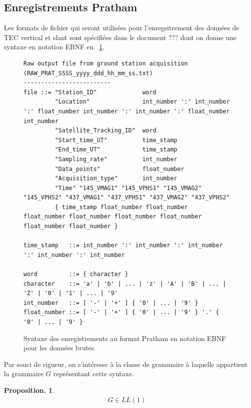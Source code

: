 \documentclass[twocolumn,pre,floats,aps,amsmath,amssymb]{revtex4}
\newtheorem{proposition}[theorem]{Proposition.}
\begin{document}
\subsection{Enregistrements Pratham}
Les formats de fichier qui seront utilis\'ees pour l'enregsitrement des donn\'ees de TEC vertical et slant sont sp\'ecifi\'ees dans le document ??? dont on donne une syntaxe en notation EBNF en ~\ref{fig:syntaxe_Pratham_format}.

\begin{figure}[]
{\scriptsize
\begin{verbatim}
Raw output file from ground station acquisition (RAW_PRAT_SSSS_yyyy_ddd_hh_mm_ss.txt)
-------------------------
file ::= "Station_ID"             word
         "Location"               int_number ':' int_number ':' float_number int_number ':' int_number ':' float_number int_number
         "Satellite_Tracking_ID"  word
         "Start_time_UT"          time_stamp
         "End_time_UT"            time_stamp
         "Sampling_rate"          int_number
         "Data_points"            float_number
         "Acquisition_type"       int_number
         "Time" "145_VMAG1" "145_VPHS1" "145_VMAG2" "145_VPHS2" "437_VMAG1" "437_VPHS1" "437_VMAG2" "437_VPHS2"
         { time_stamp float_number float_number float_number float_number float_number float_number float_number float_number }

time_stamp   ::= int_number ':' int_number ':' int_number ':' int_number ':' int_number

word         ::= { character }
character    ::= 'a' | 'b' | ... | 'z' | 'A' | 'B' | ... | 'Z' | '0' | '1' | ... | '9'
int_number   ::= [ '-' | '+' ] { '0' | ... | '9' }
float_number ::= [ '-' | '+' ] { '0' | ... | '9' } '.' { '0' | ... | '9' }

\end{verbatim}
}
  \caption{Syntaxe des enregistrements au format Pratham en notation EBNF pour les donn\'ees brutes}
  \label{fig:syntaxe_Pratham_format}
\end{figure}

Par souci de rigueur, on s'int\'eresse \`a la classe de grammaire \`a laquelle appartient la grammaire $G$ repr\'esentant cette syntaxe.

\begin{proposition}
  \begin{eqnarray*}
    G \in LL(1) 
  \end{eqnarray*} 
\end{proposition}
\end{document}
